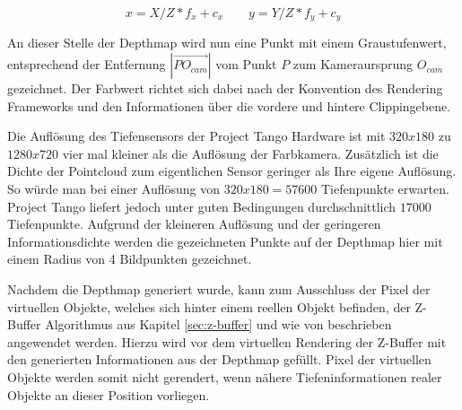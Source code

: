 \begin{equation}\label{eq:projection}
x = X / Z * f_x + c_x
\qquad
y = Y / Z * f_y + c_y
\end{equation}

An dieser Stelle der Depthmap wird nun eine Punkt mit einem Graustufenwert, entsprechend der Entfernung \(|\overrightarrow{PO_{cam}}|\) vom Punkt \(P\) zum Kameraursprung \(O_{cam}\) gezeichnet. Der Farbwert richtet sich dabei nach der Konvention des Rendering Frameworks und den Informationen über die vordere und hintere Clippingebene.

Die Auflösung des Tiefensensors der Project Tango Hardware ist mit \(320x180\) zu \(1280x720\) vier mal kleiner als die Auflösung der Farbkamera. Zusätzlich ist die Dichte der Pointcloud zum eigentlichen Sensor geringer als Ihre eigene Auflösung. So würde man bei einer Auflösung von \(320x180 = 57600\) Tiefenpunkte erwarten. Project Tango liefert jedoch unter guten Bedingungen durchschnittlich \(17000\) Tiefenpunkte. Aufgrund der kleineren Auflösung und der geringeren Informationsdichte werden die gezeichneten Punkte auf der Depthmap hier mit einem Radius von 4 Bildpunkten gezeichnet. 

Nachdem die Depthmap generiert wurde, kann zum Ausschluss der Pixel der virtuellen Objekte, welches sich hinter einem reellen Objekt befinden, der Z-Buffer Algorithmus aus Kapitel \ref{sec:z-buffer} und wie von \citet{wloka1995resolving} beschrieben angewendet werden. Hierzu wird vor dem virtuellen Rendering der Z-Buffer mit den generierten Informationen aus der Depthmap gefüllt. Pixel der virtuellen Objekte werden somit nicht gerendert, wenn nähere Tiefeninformationen realer Objekte an dieser Position vorliegen. 


